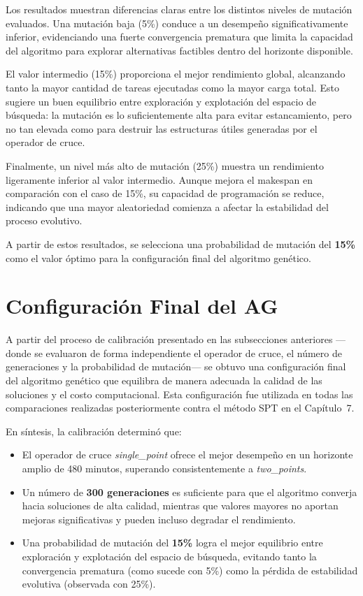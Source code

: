Los resultados muestran diferencias claras entre los distintos niveles de mutación evaluados. Una mutación baja (5\%) conduce a un desempeño significativamente inferior, evidenciando una fuerte convergencia prematura que limita la capacidad del algoritmo para explorar alternativas factibles dentro del horizonte disponible.

El valor intermedio (15\%) proporciona el mejor rendimiento global, alcanzando tanto la mayor cantidad de tareas ejecutadas como la mayor carga total. Esto sugiere un buen equilibrio entre exploración y explotación del espacio de búsqueda: la mutación es lo suficientemente alta para evitar estancamiento, pero no tan elevada como para destruir las estructuras útiles generadas por el operador de cruce.

Finalmente, un nivel más alto de mutación (25\%) muestra un rendimiento ligeramente inferior al valor intermedio. Aunque mejora el makespan en comparación con el caso de 15\%, su capacidad de programación se reduce, indicando que una mayor aleatoriedad comienza a afectar la estabilidad del proceso evolutivo.

A partir de estos resultados, se selecciona una probabilidad de mutación del \textbf{15\%} como el valor óptimo para la configuración final del algoritmo genético.

\section{Configuración Final del AG}

A partir del proceso de calibración presentado en las subsecciones anteriores ---donde se evaluaron de forma independiente el operador de cruce, el número de generaciones y la probabilidad de mutación--- se obtuvo una configuración final del algoritmo genético que equilibra de manera adecuada la calidad de las soluciones y el costo computacional. Esta configuración fue utilizada en todas las comparaciones realizadas posteriormente contra el método SPT en el Capítulo~7.

En síntesis, la calibración determinó que:

\begin{itemize}
    \item El operador de cruce \textit{single\_point} ofrece el mejor desempeño en un horizonte amplio de 480 minutos, superando consistentemente a \textit{two\_points}.
    \item Un número de \textbf{300 generaciones} es suficiente para que el algoritmo converja hacia soluciones de alta calidad, mientras que valores mayores no aportan mejoras significativas y pueden incluso degradar el rendimiento.
    \item Una probabilidad de mutación del \textbf{15\%} logra el mejor equilibrio entre exploración y explotación del espacio de búsqueda, evitando tanto la convergencia prematura (como sucede con 5\%) como la pérdida de estabilidad evolutiva (observada con 25\%).
\end{itemize}

